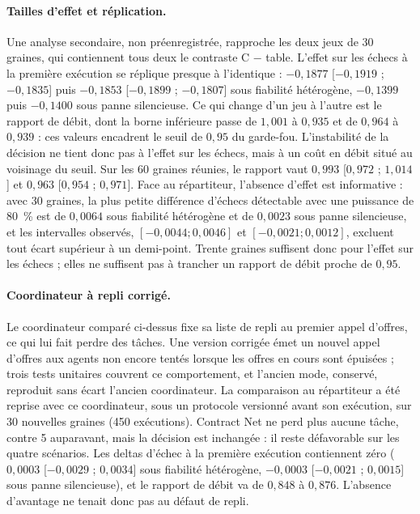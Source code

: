 \paragraph{Tailles d'effet et réplication.} Une analyse secondaire, non préenregistrée, rapproche les deux jeux de 30 graines, qui contiennent tous deux le contraste C $-$ table. L'effet sur les échecs à la première exécution se réplique presque à l'identique : $-0{,}1877$ [$-0{,}1919$ ; $-0{,}1835$] puis $-0{,}1853$ [$-0{,}1899$ ; $-0{,}1807$] sous fiabilité hétérogène, $-0{,}1399$ puis $-0{,}1400$ sous panne silencieuse. Ce qui change d'un jeu à l'autre est le rapport de débit, dont la borne inférieure passe de $1{,}001$ à $0{,}935$ et de $0{,}964$ à $0{,}939$ : ces valeurs encadrent le seuil de $0{,}95$ du garde-fou. L'instabilité de la décision ne tient donc pas à l'effet sur les échecs, mais à un coût en débit situé au voisinage du seuil. Sur les 60 graines réunies, le rapport vaut $0{,}993$ [$0{,}972$ ; $1{,}014$] et $0{,}963$ [$0{,}954$ ; $0{,}971$]. Face au répartiteur, l'absence d'effet est informative : avec 30 graines, la plus petite différence d'échecs détectable avec une puissance de 80~\% est de $0{,}0064$ sous fiabilité hétérogène et de $0{,}0023$ sous panne silencieuse, et les intervalles observés, $[-0{,}0044 ; 0{,}0046]$ et $[-0{,}0021 ; 0{,}0012]$, excluent tout écart supérieur à un demi-point. Trente graines suffisent donc pour l'effet sur les échecs ; elles ne suffisent pas à trancher un rapport de débit proche de $0{,}95$.

\paragraph{Coordinateur à repli corrigé.} Le coordinateur comparé ci-dessus fixe sa liste de repli au premier appel d'offres, ce qui lui fait perdre des tâches. Une version corrigée émet un nouvel appel d'offres aux agents non encore tentés lorsque les offres en cours sont épuisées ; trois tests unitaires couvrent ce comportement, et l'ancien mode, conservé, reproduit sans écart l'ancien coordinateur. La comparaison au répartiteur a été reprise avec ce coordinateur, sous un protocole versionné avant son exécution, sur 30 nouvelles graines (450 exécutions). Contract Net ne perd plus aucune tâche, contre 5 auparavant, mais la décision est inchangée : il reste défavorable sur les quatre scénarios. Les deltas d'échec à la première exécution contiennent zéro ($0{,}0003$ [$-0{,}0029$ ; $0{,}0034$] sous fiabilité hétérogène, $-0{,}0003$ [$-0{,}0021$ ; $0{,}0015$] sous panne silencieuse), et le rapport de débit va de $0{,}848$ à $0{,}876$. L'absence d'avantage ne tenait donc pas au défaut de repli.

